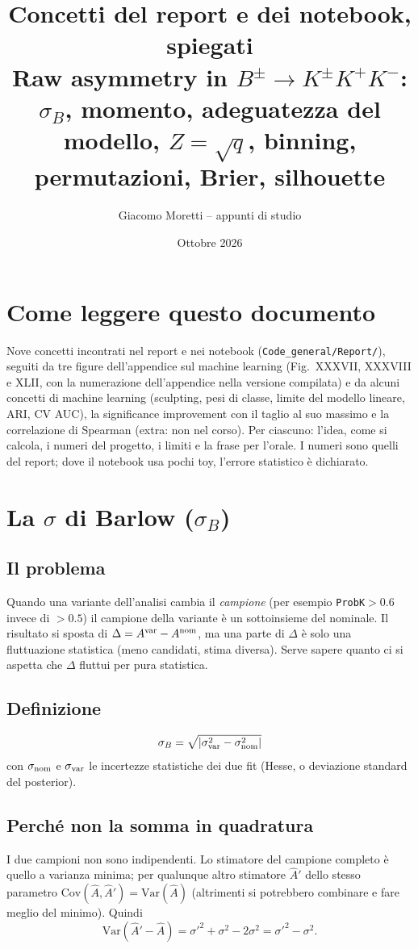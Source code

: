 \documentclass[10.5pt,a4paper]{article}
\title{\textbf{Concetti del report e dei notebook, spiegati}\\[2pt]\large Raw asymmetry in $B^\pm\to K^\pm K^+K^-$: $\sigma_B$, momento, adeguatezza del modello, $Z=\sqrt q$, binning, permutazioni, Brier, silhouette}
\author{Giacomo Moretti -- appunti di studio}
\date{Ottobre 2026}
\newcommand{\conc}[1]{\clearpage\section{#1}}
\begin{document}
\maketitle
\tableofcontents

\section*{Come leggere questo documento}
Nove concetti incontrati nel report e nei notebook (\texttt{Code\_general/Report/}), seguiti da tre figure dell'appendice sul
machine learning (Fig.~XXXVII, XXXVIII e XLII, con la numerazione dell'appendice nella versione compilata) e da alcuni concetti
di machine learning (sculpting, pesi di classe, limite del modello lineare, ARI, CV AUC), la significance improvement con il taglio
al suo massimo e la correlazione di Spearman (extra: non nel corso). Per ciascuno: l'idea,
come si calcola, i numeri del progetto, i limiti e la frase per l'orale. I numeri sono quelli del report; dove il notebook usa pochi
toy, l'errore statistico è dichiarato.

\conc{La $\sigma$ di Barlow ($\sigma_B$)}
\subsection*{Il problema}
Quando una variante dell'analisi cambia il \emph{campione} (per esempio \texttt{ProbK}$>0.6$ invece di $>0.5$) il campione della
variante è un sottoinsieme del nominale. Il risultato si sposta di $\Delta=A^{\rm var}-A^{\rm nom}$, ma una parte
di $\Delta$ è solo una fluttuazione statistica (meno candidati, stima diversa). Serve sapere quanto ci si aspetta che $\Delta$
fluttui per pura statistica.

\subsection*{Definizione}
\[
\sigma_B=\sqrt{\left|\sigma_{\rm var}^2-\sigma_{\rm nom}^2\right|}
\]
con $\sigma_{\rm nom}$ e $\sigma_{\rm var}$ le incertezze statistiche dei due fit (Hesse, o deviazione standard del posterior).

\subsection*{Perché non la somma in quadratura}
I due campioni non sono indipendenti. Lo stimatore del campione completo è quello a varianza minima; per qualunque altro stimatore
$\hat A'$ dello stesso parametro $\mathrm{Cov}(\hat A,\hat A')=\mathrm{Var}(\hat A)$ (altrimenti si potrebbero combinare e fare meglio
del minimo). Quindi
\[
\mathrm{Var}(\hat A'-\hat A)=\sigma'^2+\sigma^2-2\sigma^2=\sigma'^2-\sigma^2 .
\]
\end{document}
